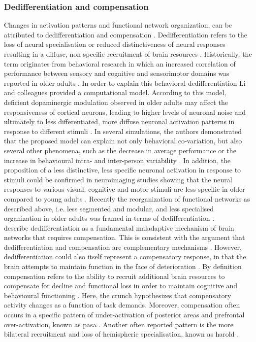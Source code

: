 \subsubsection{Dedifferentiation and compensation}
\label{theory:aging:dedif}
Changes in activation patterns and functional network organization, can be attributed to dedifferentiation and compensation \cite{Grady2012}. Dedifferentiation refers to the loss of neural specialisation or reduced distinctiveness of neural responses resulting in a diffuse, non specific recruitment of brain resources \cite{Koen2019}. Historically, the term originates from behavioral research in which an increased correlation of performance between sensory and cognitive and sensorimotor domains was reported in older adults \cite{Baltes1997,Li2002}. In order to explain this behavioral dedifferentiation Li and colleagues \cite{Li2001, Li2002} provided a computational model. According to this model, deficient dopaminergic modulation observed in older adults may affect the responsiveness of cortical neurons, leading to higher levels of neuronal noise and ultimately to less differentiated, more diffuse neuronal activation patterns in response to different stimuli \cite{Li2001,Li2002}. In several simulations, the authors demonstrated that the proposed model can explain not only behavioral co-variation, but also several other phenomena, such as the decrease in average performance or the increase in behavioural intra- and inter-person variability \cite{Li2000,Li2002}. In addition, the proposition of a less distinctive, less specific neuronal activation in response to stimuli could be confirmed in neuroimaging studies showing that the neural responses to various visual, cognitive and motor stimuli are less specific in older compared to young adults \cite{Tucker2019, Koen2019,Carb2011}. Recently the reorganization of functional networks as described above, i.e. less segmented and modular, and less specialised organization in older adults was framed in terms of dedifferentiation \cite{Deery2023, Koen2019, Sala-Llonch2015}.\\
\citeauthor{Fornito2015}\cite{Fornito2015} describe dedifferentiation as a fundamental maladaptive mechanism of brain networks that requires compensation. This is consistent with the argument that dedifferentiation and compensation are complementary mechanisms \cite{Reuter-Lorenz2010}. However, dedifferentiation could also itself represent a compensatory response, in that the brain attempts to maintain function in the face of deterioration \cite{Stern2009}. By definition compensation refers to the ability to recruit additional brain resources to compensate for decline and functional loss in order to maintain cognitive and behavioural functioning \cite{Reuter-Lorenz2010, Grady2012}. Here, the \gls{crunch} hypothesizes that compensatory activity changes as a function of task demands. Moreover, compensation often occurs in a specific pattern of under-activation of posterior areas and prefrontal over-activation, known as \gls{pasa} \cite{Davis2007}. Another often reported pattern is the more bilateral recruitment and loss of hemispheric specialisation, known as \gls{harold} \cite{Cabeza2002}.

